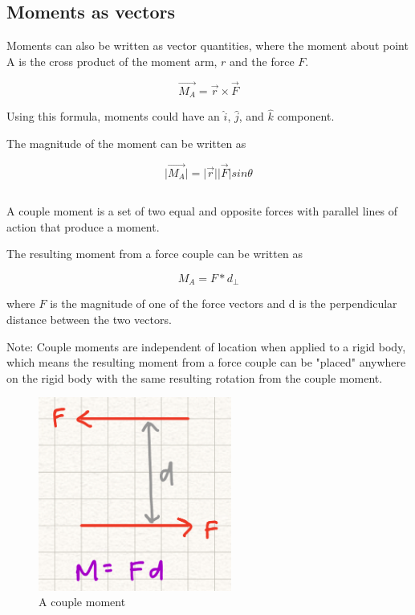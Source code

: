 
\subsection{Moments as vectors}

Moments can also be written as vector quantities, where the moment about point A is the cross product of the moment arm, $r$ and the force $F$. 

\[\vec{M_A} = \vec{r} \times \vec{F}\]

Using this formula, moments could have an $\hat{i}$, $\hat{j}$, and $\hat{k}$ component. 

The magnitude of the moment can be written as 

\[\vert\vec{M_A}\vert = \vert\vec{r}\vert \vert\vec{F}\vert sin\theta\]


\subsection{}

A couple moment is a set of two equal and opposite forces with parallel lines of action that produce a moment. 

The resulting moment from a force couple can be written as 

\[M_A = F*d_{\perp}\]

where $F$ is the magnitude of one of the force vectors and d is the perpendicular distance between the two vectors. 

Note: Couple moments are independent of location when applied to a rigid body, which means the resulting moment from a force couple can be "placed" anywhere on the rigid body with the same resulting rotation from the couple moment. 

\begin{figure}[!h]
\centering
\includegraphics[angle=0, width = 2.5in]{MomentsFigures/CoupleMoment.jpg}
\vspace{-2mm}
\caption{\small A couple moment}
\vspace{-3mm}
\label{Fig:CoupleMoment}
\end{figure}




